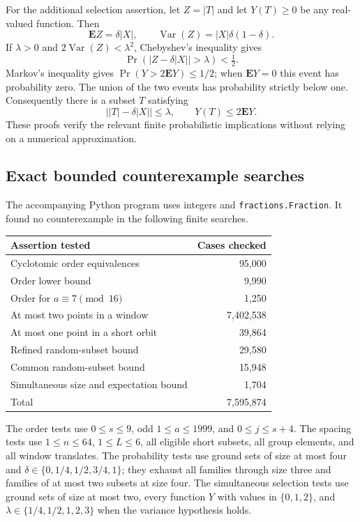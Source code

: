 \documentclass[11pt,a4paper]{article}
\theoremstyle{remark}
\newcommand{\code}[1]{\texttt{#1}}
\begin{document}
For the additional selection assertion, let $Z=|T|$ and let $Y(T)\ge0$ be any real-valued function. Then
\[
 \mathbf EZ=\delta|X|,\qquad
 \operatorname{Var}(Z)=|X|\delta(1-\delta).
\]
If $\lambda>0$ and $2\operatorname{Var}(Z)<\lambda^2$, Chebyshev's inequality gives
\[
 \Pr(|Z-\delta|X||>\lambda)<\tfrac12.
\]
Markov's inequality gives
$\Pr(Y>2\mathbf EY)\le1/2$; when $\mathbf EY=0$ this event has probability zero. The union of the two events has probability strictly below one. Consequently there is a subset $T$ satisfying
\[
 \bigl||T|-\delta|X|\bigr|\le\lambda,
 \qquad Y(T)\le2\mathbf EY.
\]
These proofs verify the relevant finite probabilistic implications without relying on a numerical approximation.

\subsection{Exact bounded counterexample searches}
The accompanying Python program uses integers and \code{fractions.Fraction}. It found no counterexample in the following finite searches.
\begin{center}
\begin{tabular}{@{}lr@{}}
\toprule
Assertion tested & Cases checked\\
\midrule
Cyclotomic order equivalences & 95,000\\
Order lower bound & 9,990\\
Order for $a\equiv7\pmod{16}$ & 1,250\\
At most two points in a window & 7,402,538\\
At most one point in a short orbit & 39,864\\
Refined random-subset bound & 29,580\\
Common random-subset bound & 15,948\\
Simultaneous size and expectation bound & 1,704\\
\midrule
Total & 7,595,874\\
\bottomrule
\end{tabular}
\end{center}
The order tests use $0\le s\le9$, odd $1\le a\le1999$, and $0\le j\le s+4$. The spacing tests use $1\le n\le64$, $1\le L\le6$, all eligible short subsets, all group elements, and all window translates. The probability tests use ground sets of size at most four and $\delta\in\{0,1/4,1/2,3/4,1\}$; they exhaust all families through size three and families of at most two subsets at size four. The simultaneous selection tests use ground sets of size at most two, every function $Y$ with values in $\{0,1,2\}$, and $\lambda\in\{1/4,1/2,1,2,3\}$ when the variance hypothesis holds.
\end{document}
